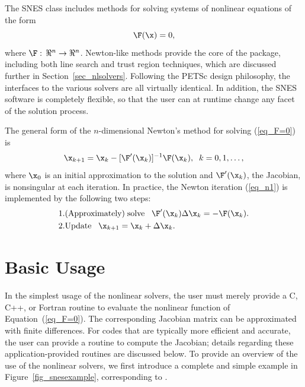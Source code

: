 The SNES class includes methods for solving systems of nonlinear equations of the form 
\begin{equation}
\F(\x) = 0,
\label{eq_F=0}
\end{equation}
where $\F: \, \Re^n \to \Re^n$.
Newton-like methods provide the core of the package, including
 both line search  
and trust region  techniques, which are discussed
further in Section~\ref{sec_nlsolvers}. Following the
PETSc design philosophy, the interfaces to the various solvers are all
virtually identical. In addition, the SNES software is completely
flexible, so that the user can at runtime change any facet of the
solution process.

The general form of the $n$-dimensional Newton's method for solving
(\ref{eq_F=0}) is
\begin{equation}
     \x_{k+1} = \x_k - [ \F'(\x_k)]^{-1} \F(\x_k), \;\; k=0,1, \ldots, 
\label{eq_n1}
\end{equation}
where $ \x_0 $ is an initial approximation to the solution and   
$ \F'(\x_k) $, the Jacobian, is nonsingular at each iteration.  
In practice, the Newton iteration (\ref{eq_n1}) is implemented by
the following two steps:
\begin{eqnarray}
  1. & {\rm (Approximately) \;solve\;\;\;} \F'(\x_k) \Delta \x_k = -\F(\x_k).\\
  2. & {\rm Update\;\;\;} \x_{k+1} = \x_k + \Delta \x_k. \hspace{.225in}
\end{eqnarray}


\section{Basic Usage}
\label{sec_snesusage}

In the simplest usage of the nonlinear solvers, the user must merely 
provide a C, C++, or Fortran routine to evaluate the nonlinear function 
of Equation~(\ref{eq_F=0}).
The corresponding Jacobian  matrix 
can be approximated with finite differences.
For codes that are typically more efficient and accurate, the
user can provide a routine to compute the Jacobian; details regarding these application-provided 
routines are discussed below.  
To provide an overview of the use of the nonlinear solvers,
we first introduce a complete and simple example in
Figure~\ref{fig_snesexample}, corresponding to 
.  

